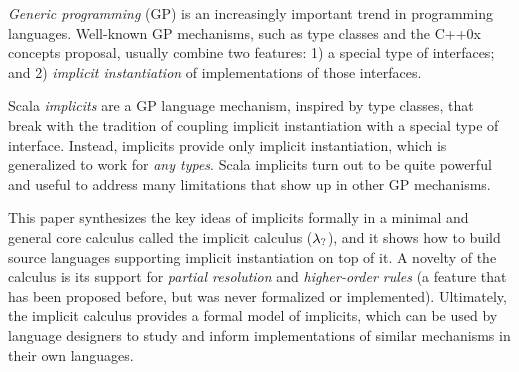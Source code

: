 \emph{Generic programming} (GP) is an increasingly important trend in
programming languages. Well-known GP mechanisms, such as type classes
and the C++0x concepts proposal, usually combine two features: 1) a special type of
interfaces; and 2) \emph{implicit instantiation} of implementations of
those interfaces.

Scala \emph{implicits} are a GP language mechanism, inspired by type
classes, that break with the tradition of coupling
implicit instantiation with a special type of interface. Instead,
implicits provide only implicit instantiation, which is generalized to
work for \emph{any types}. 
Scala implicits turn out to be quite
powerful and useful to address many limitations that show up in other
GP mechanisms.

This paper synthesizes the key ideas of implicits formally in a minimal
and general core calculus called the implicit calculus ($\lambda_{?}$),
and it shows how to build source languages supporting implicit
instantiation on top of it. A novelty of the calculus is its support
for \emph{partial resolution} and \emph{higher-order rules} (a feature 
that has been proposed before, but was never formalized or implemented).
Ultimately, the implicit calculus provides a formal model of implicits, 
which can be used by language designers to 
study and inform implementations of similar mechanisms in their own languages.






